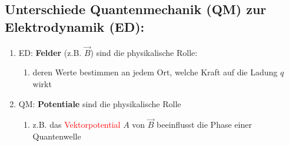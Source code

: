 \subsection{Unterschiede Quantenmechanik (QM) zur Elektrodynamik (ED):}
\begin{enumerate}
    \item ED: \textbf{Felder} (z.B. $\vec{B}$) sind die physikalische Rolle:
    \begin{enumerate}
        \item deren Werte bestimmen an jedem Ort, welche Kraft auf die Ladung $q$ wirkt

    \end{enumerate}
    \item QM: \textbf{Potentiale} sind die physikalische Rolle
\begin{enumerate}
    \item z.B. das \textcolor{red}{Vektorpotential} $A$ von $\vec{B}$ beeinflusst die Phase einer Quantenwelle 
\end{enumerate}
\end{enumerate}

\newpage